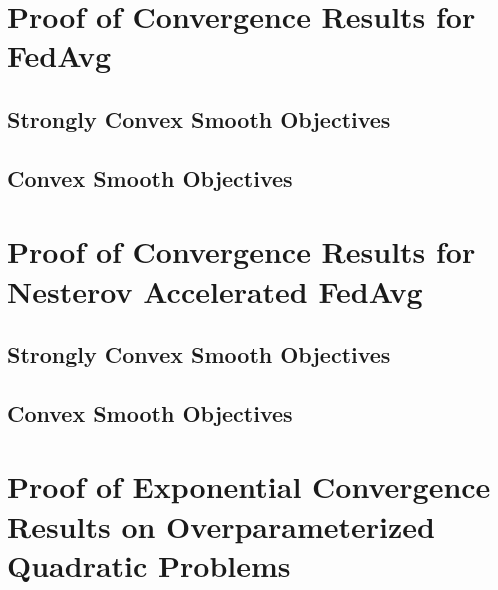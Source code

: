 




\section{Proof of Convergence Results for FedAvg}
\label{sec:app:fedavg}
\subsection{Strongly Convex Smooth Objectives}


\subsection{Convex Smooth Objectives}
\label{sec:nasgdscvxsmth}
%


\section{Proof of Convergence Results for Nesterov Accelerated FedAvg}
\label{sec:app:Nesterovfedavg}
\subsection{Strongly Convex Smooth Objectives}
\label{sec:convexsmoothsgd}
%


\subsection{Convex Smooth Objectives}
\label{sec:nasgdcvxsmth}
%


\section{Proof of Exponential Convergence Results on Overparameterized Quadratic Problems}
\label{sec:interpolation}


